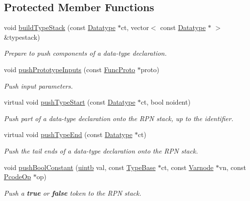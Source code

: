 \subsection*{Protected Member Functions}
\begin{DoxyCompactItemize}
\item 
void \mbox{\hyperlink{class_print_c_a18fa1574b22c87e7ef25e4a0b99284ac}{build\+Type\+Stack}} (const \mbox{\hyperlink{class_datatype}{Datatype}} $\ast$ct, vector$<$ const \mbox{\hyperlink{class_datatype}{Datatype}} $\ast$ $>$ \&typestack)
\begin{DoxyCompactList}\small\item\em Prepare to push components of a data-\/type declaration. \end{DoxyCompactList}\item 
void \mbox{\hyperlink{class_print_c_aae46702bfe38061e0c0563f7a8a20d82}{push\+Prototype\+Inputs}} (const \mbox{\hyperlink{class_func_proto}{Func\+Proto}} $\ast$proto)
\begin{DoxyCompactList}\small\item\em Push input parameters. \end{DoxyCompactList}\item 
virtual void \mbox{\hyperlink{class_print_c_a0b96904bf7b1ecfb6b254c51707ae21a}{push\+Type\+Start}} (const \mbox{\hyperlink{class_datatype}{Datatype}} $\ast$ct, bool noident)
\begin{DoxyCompactList}\small\item\em Push part of a data-\/type declaration onto the R\+PN stack, up to the identifier. \end{DoxyCompactList}\item 
virtual void \mbox{\hyperlink{class_print_c_a45d0e43f9f4e91353db9aeb4c053deaa}{push\+Type\+End}} (const \mbox{\hyperlink{class_datatype}{Datatype}} $\ast$ct)
\begin{DoxyCompactList}\small\item\em Push the tail ends of a data-\/type declaration onto the R\+PN stack. \end{DoxyCompactList}\item 
void \mbox{\hyperlink{class_print_c_a735ddb9bb724110dbd9d1e3b5e381b6d}{push\+Bool\+Constant}} (\mbox{\hyperlink{types_8h_a2db313c5d32a12b01d26ac9b3bca178f}{uintb}} val, const \mbox{\hyperlink{class_type_base}{Type\+Base}} $\ast$ct, const \mbox{\hyperlink{class_varnode}{Varnode}} $\ast$vn, const \mbox{\hyperlink{class_pcode_op}{Pcode\+Op}} $\ast$op)
\begin{DoxyCompactList}\small\item\em Push a {\bfseries{true}} or {\bfseries{false}} token to the R\+PN stack. \end{DoxyCompactList}\item 

\end{DoxyCompactItemize}
